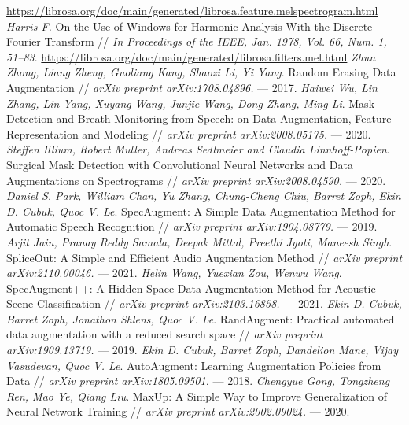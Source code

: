 \documentclass[12pt, fleqn]{article}
\begin{document}
\newpage
\begin{thebibliography}{3}
    \url{https://librosa.org/doc/main/generated/librosa.feature.melspectrogram.html}
    \textit{Harris F.} On the Use of Windows for Harmonic Analysis With the Discrete Fourier Transform // \textit{In Proceedings of the IEEE, Jan. 1978, Vol. 66, Num. 1, 51--83}.
    \url{https://librosa.org/doc/main/generated/librosa.filters.mel.html}
	\textit{Zhun Zhong, Liang Zheng, Guoliang Kang, Shaozi Li, Yi Yang}. Random Erasing Data Augmentation // \textit{arXiv preprint arXiv:1708.04896.} --- 2017.
	\textit{Haiwei Wu, Lin Zhang, Lin Yang, Xuyang Wang, Junjie Wang, Dong Zhang, Ming Li}. Mask Detection and Breath Monitoring from Speech: on Data Augmentation,
	Feature Representation and Modeling // \textit{arXiv preprint arXiv:2008.05175.} --- 2020.
	\textit{Steffen Illium, Robert Muller, Andreas Sedlmeier and Claudia Linnhoff-Popien}. Surgical Mask Detection with Convolutional Neural Networks and Data
	Augmentations on Spectrograms // \textit{arXiv preprint arXiv:2008.04590.} --- 2020.
	\textit{Daniel S. Park, William Chan, Yu Zhang, Chung-Cheng Chiu, Barret Zoph, Ekin D. Cubuk, Quoc V. Le}. SpecAugment: A Simple Data Augmentation Method
	for Automatic Speech Recognition // \textit{arXiv preprint arXiv:1904.08779.} --- 2019.
	\textit{Arjit Jain, Pranay Reddy Samala, Deepak Mittal, Preethi Jyoti, Maneesh Singh}. SpliceOut: A Simple and Efficient Audio Augmentation Method // \textit{arXiv preprint arXiv:2110.00046.} --- 2021.
	\textit{Helin Wang, Yuexian Zou, Wenwu Wang}. SpecAugment++: A Hidden Space Data Augmentation Method for Acoustic Scene Classification // \textit{arXiv preprint arXiv:2103.16858.} --- 2021.
	\textit{Ekin D. Cubuk, Barret Zoph, Jonathon Shlens, Quoc V. Le}. RandAugment: Practical automated data augmentation with a reduced search space // \textit{arXiv preprint arXiv:1909.13719.} --- 2019.
	\textit{Ekin D. Cubuk, Barret Zoph, Dandelion Mane, Vijay Vasudevan, Quoc V. Le}. AutoAugment: Learning Augmentation Policies from Data // \textit{arXiv preprint arXiv:1805.09501.} --- 2018.
	\textit{Chengyue Gong, Tongzheng Ren, Mao Ye, Qiang Liu}. MaxUp: A Simple Way to Improve Generalization of Neural Network Training // \textit{arXiv preprint arXiv:2002.09024.} --- 2020.

\end{thebibliography}
\end{document}
